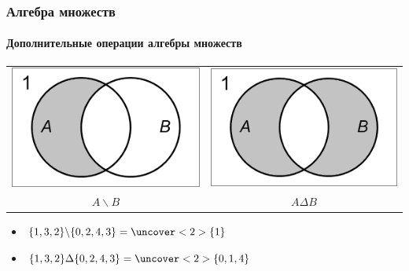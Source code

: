 \begin{frame}
    \frametitle{Алгебра множеств}
    \framesubtitle{Дополнительные операции алгебры множеств}
    
    \begin{center}
        \begin{tabular}{cc}
            \includegraphics[width=.3\textwidth]{fig/ABSetSub}
                & \includegraphics[width=.3\textwidth]{fig/ABSetSymSub}
                    \\
            $A\backslash B$ 
                & $A\Delta B$
        \end{tabular}
    \end{center}
    
    \begin{itemize}
        \item $\{1,3,2\}\backslash\{0,2,4,3\}=\uncover<2>{\{1\}}$
        \item $\{1,3,2\}\Delta\{0,2,4,3\}=\uncover<2>{\{0,1,4\}}$
    \end{itemize}    
\end{frame}

